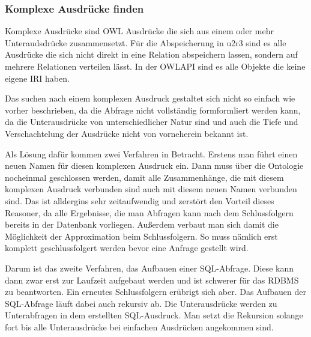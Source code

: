 \subsubsection{Komplexe Ausdrücke finden}

Komplexe Ausdrücke sind OWL Ausdrücke die sich aus einem oder mehr Unteraudsdrücke zusammensetzt. Für die Abspeicherung in u2r3 sind es alle Ausdrücke die sich nicht direkt in eine Relation abspeichern lassen, sondern auf mehrere Relationen verteilen lässt. In der OWLAPI sind es alle Objekte die keine eigene IRI haben.

Das suchen nach einem komplexen Ausdruck gestaltet sich nicht so einfach wie vorher beschrieben, da die Abfrage nicht vollständig formformliert werden kann, da die Unterausdrücke von unterschiedlicher Natur sind und auch die Tiefe und Verschachtelung der Ausdrücke nicht von vorneherein bekannt ist.

Als Lösung dafür kommen zwei Verfahren in Betracht. Erstens man führt einen neuen Namen für diesen komplexen Ausdruck ein. Dann muss über die Ontologie nocheinmal geschlossen werden, damit alle Zusammenhänge, die mit diesem komplexen Ausdruck verbunden sind auch mit diesem neuen Namen verbunden sind. Das ist alldergins sehr zeitaufwendig und zerstört den Vorteil dieses Reasoner, da alle Ergebnisse, die man Abfragen kann nach dem Schlussfolgern bereits in der Datenbank vorliegen. Außerdem verbaut man sich damit die Möglichkeit der Approximation beim Schlussfolgern. So muss nämlich erst komplett geschlussfolgert werden bevor eine Anfrage gestellt wird.

Darum ist das zweite Verfahren, das Aufbauen einer SQL-Abfrage. Diese kann dann zwar erst zur Laufzeit aufgebaut werden und ist schwerer für das RDBMS zu beantworten. Ein erneutes Schlussfolgern erübrigt sich aber. Das Aufbauen der SQL-Abfrage läuft dabei auch rekursiv ab. Die Unterausdrücke werden zu Unterabfragen in dem erstellten SQL-Ausdruck. Man setzt die Rekursion solange fort bis alle Unterausdrücke bei einfachen Ausdrücken angekommen sind.